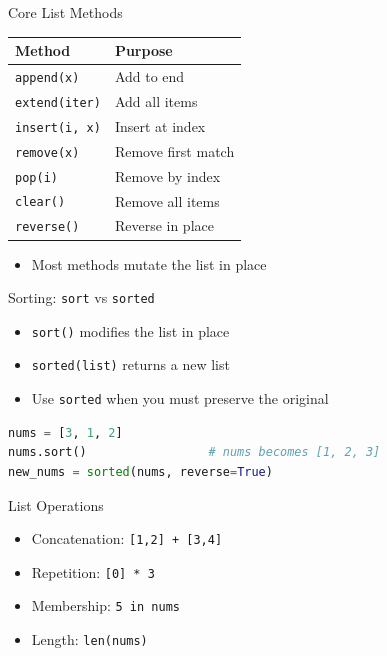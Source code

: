 \documentclass{beamer}
\begin{document}
\begin{frame}[fragile]{Core List Methods}
  \small
  \begin{tabular}{ll}
    \toprule
    Method & Purpose \\
    \midrule
    \texttt{append(x)} & Add to end \\
    \texttt{extend(iter)} & Add all items \\
    \texttt{insert(i, x)} & Insert at index \\
    \texttt{remove(x)} & Remove first match \\
    \texttt{pop(i)} & Remove by index \\
    \texttt{clear()} & Remove all items \\
    \texttt{reverse()} & Reverse in place \\
    \bottomrule
  \end{tabular}
  \normalsize
  \vspace{0.6em}
  \begin{itemize}[<+->]
    \item Most methods mutate the list in place
  \end{itemize}
\end{frame}

\begin{frame}[fragile]{Sorting: \texttt{sort} vs \texttt{sorted}}
  \begin{itemize}[<+->]
    \item \texttt{sort()} modifies the list in place
    \item \texttt{sorted(list)} returns a new list
    \item Use \texttt{sorted} when you must preserve the original
  \end{itemize}
  \vspace{0.4em}
  \begin{lstlisting}[language=Python]
nums = [3, 1, 2]
nums.sort()                 # nums becomes [1, 2, 3]
new_nums = sorted(nums, reverse=True)
  \end{lstlisting}
\end{frame}

\begin{frame}[fragile]{List Operations}
  \begin{itemize}[<+->]
    \item Concatenation: \texttt{[1,2] + [3,4]}
    \item Repetition: \texttt{[0] * 3}
    \item Membership: \texttt{5 in nums}
    \item Length: \texttt{len(nums)}
  \end{itemize}
\end{frame}
\end{document}
